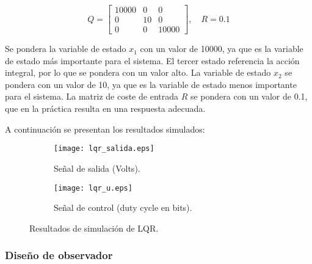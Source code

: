 \vspace{-0.5cm}
\begin{equation}
    Q =
    \begin{bmatrix}
        10000 & 0 & 0 \\
        0 & 10 & 0 \\
        0 & 0 & 10000
    \end{bmatrix}
    , \quad
    R = 0.1
\end{equation}

Se pondera la variable de estado $x_1$ con un valor de 10000, ya que es la variable de estado más importante para el sistema. El tercer
estado referencia la acción integral, por lo que se pondera con un valor alto. La variable de estado $x_2$ se pondera con un valor de 10,
ya que es la variable de estado menos importante para el sistema. La matriz de coste de entrada $R$ se pondera con un valor de 0.1, que
en la práctica resulta en una respuesta adecuada.

A continuación se presentan los resultados simulados:

\begin{figure}[H]
    \centering

    \begin{subfigure}[b]{0.49\textwidth}
        \centering
        \texttt{[image: lqr\_salida.eps]}
        \caption{Señal de salida (Volts).}
        \label{fig:lqr_simulacion_y}
    \end{subfigure}
    \begin{subfigure}[b]{0.49\textwidth}
        \centering
        \texttt{[image: lqr\_u.eps]}
        \caption{Señal de control (duty cycle en bits).}
        \label{fig:lqr_simulacion_u}
    \end{subfigure}

    \vspace{-0.25cm}
    \caption{Resultados de simulación de LQR.}
    \label{fig:lqr_simulacion}
\end{figure}
\vspace{-0.5cm}

\vspace{-0.25cm}
\subsubsection{\textbf{Diseño de observador}}
\vspace{-0.25cm}

